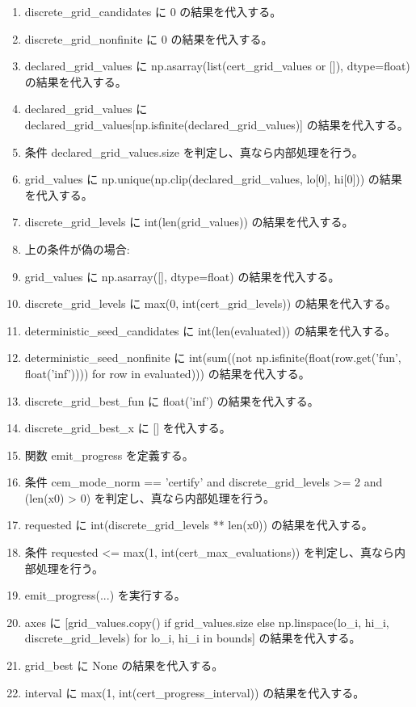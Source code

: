 \documentclass[a4paper,11pt]{article}
\begin{document}
\begin{enumerate}[leftmargin=1.8em]
\item discrete\_grid\_candidates に 0 の結果を代入する。
\item discrete\_grid\_nonfinite に 0 の結果を代入する。
\item declared\_grid\_values に np.asarray(list(cert\_grid\_values or []), dtype=float) の結果を代入する。
\item declared\_grid\_values に declared\_grid\_values[np.isfinite(declared\_grid\_values)] の結果を代入する。
\item 条件 declared\_grid\_values.size を判定し、真なら内部処理を行う。
\item   grid\_values に np.unique(np.clip(declared\_grid\_values, lo[0], hi[0])) の結果を代入する。
\item   discrete\_grid\_levels に int(len(grid\_values)) の結果を代入する。
\item   上の条件が偽の場合:
\item   grid\_values に np.asarray([], dtype=float) の結果を代入する。
\item   discrete\_grid\_levels に max(0, int(cert\_grid\_levels)) の結果を代入する。
\item deterministic\_seed\_candidates に int(len(evaluated)) の結果を代入する。
\item deterministic\_seed\_nonfinite に int(sum((not np.isfinite(float(row.get('fun', float('inf')))) for row in evaluated))) の結果を代入する。
\item discrete\_grid\_best\_fun に float('inf') の結果を代入する。
\item discrete\_grid\_best\_x に [] を代入する。
\item 関数 emit\_progress を定義する。
\item 条件 cem\_mode\_norm == 'certify' and discrete\_grid\_levels >= 2 and (len(x0) > 0) を判定し、真なら内部処理を行う。
\item   requested に int(discrete\_grid\_levels ** len(x0)) の結果を代入する。
\item   条件 requested <= max(1, int(cert\_max\_evaluations)) を判定し、真なら内部処理を行う。
\item     emit\_progress(...) を実行する。
\item     axes に [grid\_values.copy() if grid\_values.size else np.linspace(lo\_i, hi\_i, discrete\_grid\_levels) for lo\_i, hi\_i in bounds] の結果を代入する。
\item     grid\_best に None の結果を代入する。
\item     interval に max(1, int(cert\_progress\_interval)) の結果を代入する。

\end{enumerate}
\end{document}
